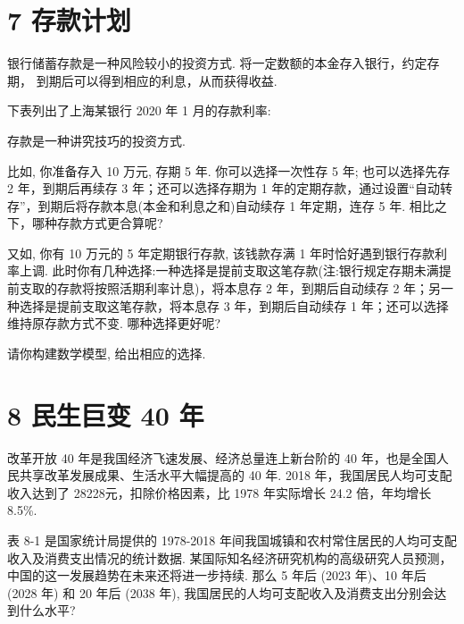 \documentclass[10pt]{article}
\begin{document}
\section*{7 存款计划}

银行储蓄存款是一种风险较小的投资方式. 将一定数额的本金存入银行，约定存期， 到期后可以得到相应的利息，从而获得收益.

下表列出了上海某银行 2020 年 1 月的存款利率:

\begin{center}
\end{center}

存款是一种讲究技巧的投资方式.

比如, 你准备存入 10 万元, 存期 5 年. 你可以选择一次性存 5 年; 也可以选择先存 2 年，到期后再续存 3 年；还可以选择存期为 1 年的定期存款，通过设置“自动转存”，到期后将存款本息(本金和利息之和)自动续存 1 年定期，连存 5 年. 相比之下，哪种存款方式更合算呢?

又如, 你有 10 万元的 5 年定期银行存款, 该钱款存满 1 年时恰好遇到银行存款利率上调. 此时你有几种选择:一种选择是提前支取这笔存款(注:银行规定存期未满提前支取的存款将按照活期利率计息)，将本息存 2 年，到期后自动续存 2 年；另一种选择是提前支取这笔存款，将本息存 3 年，到期后自动续存 1 年；还可以选择维持原存款方式不变. 哪种选择更好呢?

请你构建数学模型, 给出相应的选择.



\section*{8 民生巨变 40 年}

改革开放 40 年是我国经济飞速发展、经济总量连上新台阶的 40 年，也是全国人民共享改革发展成果、生活水平大幅提高的 40 年. 2018 年，我国居民人均可支配收入达到了 28228元，扣除价格因素，比 1978 年实际增长 24.2 倍，年均增长 8.5\%.

表 8-1 是国家统计局提供的 1978-2018 年间我国城镇和农村常住居民的人均可支配收入及消费支出情况的统计数据. 某国际知名经济研究机构的高级研究人员预测，中国的这一发展趋势在未来还将进一步持续. 那么 5 年后 (2023 年)、10 年后 (2028 年) 和 20 年后 (2038 年), 我国居民的人均可支配收入及消费支出分别会达到什么水平?
\end{document}
